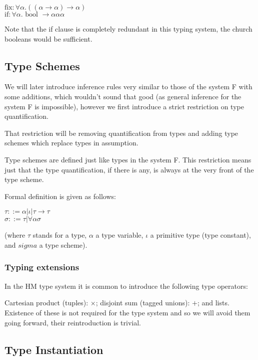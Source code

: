 $\text{fix}: \forall \alpha . ((\alpha \rightarrow \alpha) \rightarrow \alpha)$ \\
$\text{if}: \forall \alpha . \text{ bool } \rightarrow \alpha \alpha \alpha$

Note that the if clause is completely redundant in this typing system, the church booleans would be sufficient. %


\subsection{Type Schemes}

We will later introduce inference rules very similar to those of the system F with some additions, which wouldn't sound that good (as general inference for the system F is impossible), however we first introduce a strict restriction on type quantification.

That restriction will be removing quantification from types and adding type schemes which replace types in assumption.

Type schemes are defined just like types in the system F. This restriction means just that the type quantification, if there is any, is always at the very front of the type scheme.

Formal definition is given as follows:

$\tau ::= \alpha | \iota | \tau \rightarrow \tau$ \\
$\sigma ::= \tau | \forall \alpha \sigma$

(where $\tau$ stands for a type, $\alpha$ a type variable, $\iota$ a primitive type (type constant), and $sigma$ a type scheme). %

\subsubsection{Typing extensions}

In the HM type system it is common to introduce the following type operators:

Cartesian product (tuples): $\times$; disjoint sum (tagged unions): $+$; and lists. Existence of these is not required for the type system and so we will avoid them going forward, their reintroduction is trivial.

\subsection{Type Instantiation}


